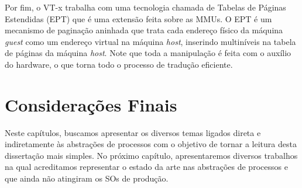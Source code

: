 Por fim, o VT-x trabalha com uma tecnologia chamada de Tabelas de Páginas
Estendidas (EPT) que é uma extensão feita sobre as MMUs. O EPT é um mecanismo
de paginação aninhada que trata cada endereço físico da máquina \emph{guest}
como um endereço virtual na máquina \emph{host}, inserindo multiníveis na
tabela de páginas da máquina \emph{host}. Note que toda a manipulação é feita
com o auxílio do hardware, o que torna todo o processo de tradução eficiente.

\section{Considerações Finais}

Neste capítulos, buscamos apresentar os diversos temas ligados direta e
indiretamente às abstrações de processos com o objetivo de tornar a leitura
desta dissertação mais simples. No próximo capítulo, apresentaremos diversos
trabalhos na qual acreditamos representar o estado da arte nas abstrações de
processos e que ainda não atingiram os SOs de produção.

